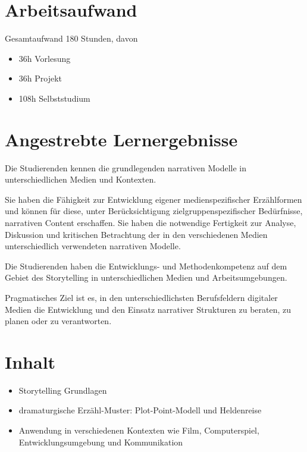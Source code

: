 \section*{Arbeitsaufwand\label{/mi-2017/modulbeschreibungen-master/MA_VC_Modul_Storytelling}}\label{arbeitsaufwandpathlabelmi-2017modulbeschreibungen-mastermaux5fvcux5fmodulux5fstorytelling}

Gesamtaufwand 180 Stunden, davon

\begin{itemize}
\tightlist
\item
  36h Vorlesung
\item
  36h Projekt
\item
  108h Selbststudium
\end{itemize}

\section*{Angestrebte
Lernergebnisse\label{/mi-2017/modulbeschreibungen-master/MA_VC_Modul_Storytelling}}\label{angestrebte-lernergebnissepathlabelmi-2017modulbeschreibungen-mastermaux5fvcux5fmodulux5fstorytelling}

Die Studierenden kennen die grundlegenden narrativen Modelle in
unterschiedlichen Medien und Kontexten.

Sie haben die Fähigkeit zur Entwicklung eigener medienspezifischer
Erzählformen und können für diese, unter Berücksichtigung
zielgruppenspezifischer Bedürfnisse, narrativen Content erschaffen. Sie
haben die notwendige Fertigkeit zur Analyse, Diskussion und kritischen
Betrachtung der in den verschiedenen Medien unterschiedlich verwendeten
narrativen Modelle.

Die Studierenden haben die Entwicklungs- und Methodenkompetenz auf dem
Gebiet des Storytelling in unterschiedlichen Medien und
Arbeitsumgebungen.

Pragmatisches Ziel ist es, in den unterschiedlichsten Berufsfeldern
digitaler Medien die Entwicklung und den Einsatz narrativer Strukturen
zu beraten, zu planen oder zu verantworten.

\section*{Inhalt\label{/mi-2017/modulbeschreibungen-master/MA_VC_Modul_Storytelling}}\label{inhaltpathlabelmi-2017modulbeschreibungen-mastermaux5fvcux5fmodulux5fstorytelling}

\begin{itemize}
\tightlist
\item
  Storytelling Grundlagen
\item
  dramaturgische Erzähl-Muster: Plot-Point-Modell und Heldenreise
\item
  Anwendung in verschiedenen Kontexten wie Film, Computerspiel,
  Entwicklungsumgebung und Kommunikation
\end{itemize}

